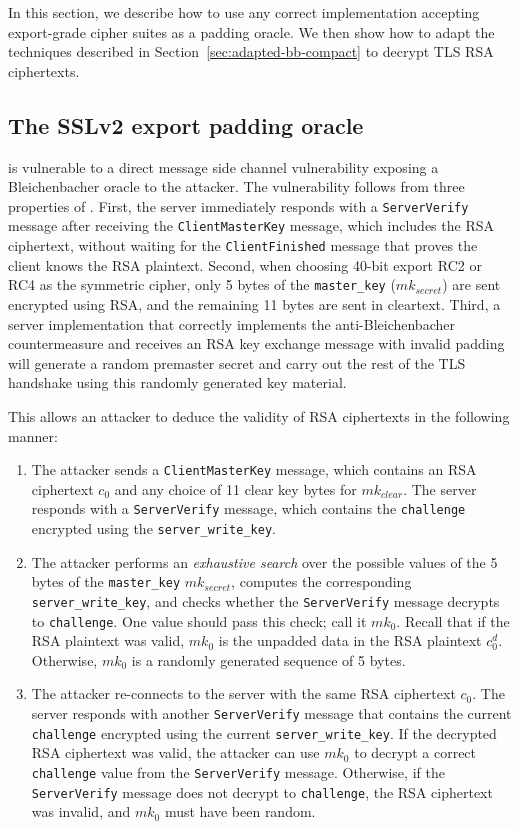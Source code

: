 In this section, we describe how to use any correct \ssltwo implementation accepting export-grade cipher suites as a padding oracle.  We then show how to adapt the techniques described in Section~\ref{sec:adapted-bb-compact} to decrypt TLS RSA ciphertexts.

\subsection{The SSLv2 export padding oracle} 
\ssltwo is vulnerable to a direct message side channel vulnerability exposing a Bleichenbacher oracle to the attacker.
The vulnerability follows from three properties of \ssltwo.  First, the server immediately responds with a \texttt{ServerVerify} message after receiving the \texttt{ClientMasterKey} message, which includes the RSA ciphertext, without waiting for the \texttt{ClientFinished} message that proves the client knows the RSA plaintext.  Second, when choosing 40-bit export RC2 or RC4 as the symmetric cipher, only 5 bytes of the \texttt{master\_key} ($mk_{secret}$) are sent encrypted using RSA, and the remaining 11 bytes are sent in cleartext.  Third, a server
implementation that correctly implements the anti-Bleichenbacher countermeasure 
and receives an RSA key exchange message with invalid
padding will generate a random premaster secret and carry out the
rest of the TLS handshake using this randomly generated key material.

This allows an attacker to deduce the validity of RSA ciphertexts in the following manner:

\begin{enumerate}
	\item The attacker sends a \texttt{ClientMasterKey} message, which contains an RSA ciphertext $c_0$ and any choice of 11 clear key bytes for $mk_{clear}$. The server responds with a \texttt{ServerVerify} message, which contains the \texttt{challenge} encrypted using the \texttt{server\_write\_key}.
	\item The attacker performs an \textit{exhaustive search} over the possible values of the 5 bytes of the \texttt{master\_key} $mk_{secret}$, computes the corresponding \texttt{server\_write\_key}, and checks whether the \texttt{ServerVerify} message decrypts to \texttt{challenge}. One value should pass this check; call it $mk_0$. Recall that if the RSA plaintext was valid, $mk_0$ is the unpadded data in the RSA plaintext $c_0 ^d$. Otherwise, $mk_0$ is a randomly generated sequence of 5 bytes.
	\item The attacker re-connects to the server with the same RSA ciphertext $c_0$. The server responds with another \texttt{ServerVerify} message that contains the current \texttt{challenge} encrypted using the current \texttt{server\_write\_key}. If the decrypted RSA ciphertext was valid, the attacker can use $mk_0$ to decrypt a correct \texttt{challenge} value from the \texttt{ServerVerify} message. Otherwise, if the \texttt{ServerVerify} message does not decrypt to \texttt{challenge}, the RSA ciphertext was invalid, and $mk_0$ must have been random.
\end{enumerate}

